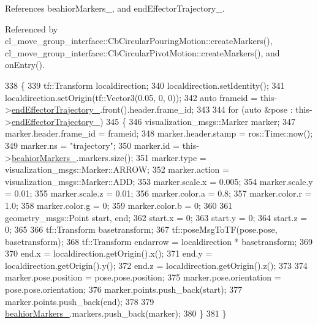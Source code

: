 References beahior\+Markers\+\_\+, and end\+Effector\+Trajectory\+\_\+.



Referenced by cl\+\_\+move\+\_\+group\+\_\+interface\+::\+Cb\+Circular\+Pouring\+Motion\+::create\+Markers(), cl\+\_\+move\+\_\+group\+\_\+interface\+::\+Cb\+Circular\+Pivot\+Motion\+::create\+Markers(), and on\+Entry().


\begin{DoxyCode}
338     \{
339         tf::Transform localdirection;
340         localdirection.setIdentity();
341         localdirection.setOrigin(tf::Vector3(0.05, 0, 0));
342         \textcolor{keyword}{auto} frameid = this->\hyperlink{classcl__move__group__interface_1_1CbMoveEndEffectorTrajectory_ae13dfd31ea3660646e03882f0c2c29f0}{endEffectorTrajectory\_}.front().header.frame\_id;
343 
344         \textcolor{keywordflow}{for} (\textcolor{keyword}{auto} &pose : this->\hyperlink{classcl__move__group__interface_1_1CbMoveEndEffectorTrajectory_ae13dfd31ea3660646e03882f0c2c29f0}{endEffectorTrajectory\_})
345         \{
346             visualization\_msgs::Marker marker;
347             marker.header.frame\_id = frameid;
348             marker.header.stamp = ros::Time::now();
349             marker.ns = \textcolor{stringliteral}{"trajectory"};
350             marker.id = this->\hyperlink{classcl__move__group__interface_1_1CbMoveEndEffectorTrajectory_a809fb5385adf27c0a1c8f8136566949c}{beahiorMarkers\_}.markers.size();
351             marker.type = visualization\_msgs::Marker::ARROW;
352             marker.action = visualization\_msgs::Marker::ADD;
353             marker.scale.x = 0.005;
354             marker.scale.y = 0.01;
355             marker.scale.z = 0.01;
356             marker.color.a = 0.8;
357             marker.color.r = 1.0;
358             marker.color.g = 0;
359             marker.color.b = 0;
360 
361             geometry\_msgs::Point start, end;
362             start.x = 0;
363             start.y = 0;
364             start.z = 0;
365 
366             tf::Transform basetransform;
367             tf::poseMsgToTF(pose.pose, basetransform);
368             tf::Transform endarrow = localdirection * basetransform;
369 
370             end.x = localdirection.getOrigin().x();
371             end.y = localdirection.getOrigin().y();
372             end.z = localdirection.getOrigin().z();
373 
374             marker.pose.position = pose.pose.position;
375             marker.pose.orientation = pose.pose.orientation;
376             marker.points.push\_back(start);
377             marker.points.push\_back(end);
378 
379             \hyperlink{classcl__move__group__interface_1_1CbMoveEndEffectorTrajectory_a809fb5385adf27c0a1c8f8136566949c}{beahiorMarkers\_}.markers.push\_back(marker);
380         \}
381     \}
\end{DoxyCode}
